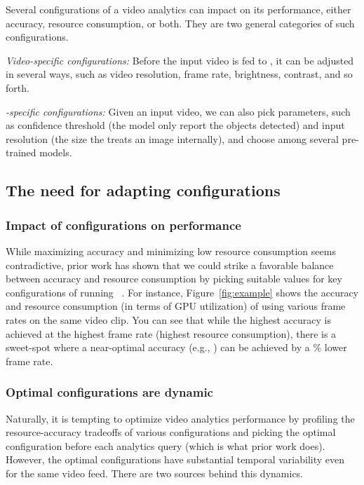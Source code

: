 Several configurations of a video analytics can impact on its 
performance, either accuracy, resource consumption, or both.
They are two general categories of such configurations.
\begin{packeditemize}
\item {\em Video-specific configurations:}
Before the input video is fed to \nn, it can be adjusted in several 
ways, such as video resolution, frame rate, brightness, contrast, and
so forth.
\item {\em \nn-specific configurations:}
Given an input video, we can also pick \nn parameters, such
as confidence threshold (the \nn model only report the objects 
detected) and input resolution (the size the \nn treats an image 
internally), and choose among several pre-trained \nn models.
\end{packeditemize}


\subsection{The need for adapting configurations}

\subsubsection{Impact of configurations on \nn performance}
While maximizing accuracy and minimizing low resource consumption 
seems contradictive, prior work has shown that we could strike a 
favorable balance between accuracy and resource consumption by 
picking suitable values for key configurations of running 
\nn~\cite{videostorm,noscope}.
For instance, Figure~\ref{fig:example} shows the accuracy and 
resource consumption (in terms of GPU utilization) of using various 
frame rates on the same video clip. 
 You can see that while the highest accuracy is achieved at the 
highest frame rate (highest resource consumption), there is a 
sweet-spot where a near-optimal accuracy (e.g., \fillme) can be 
achieved by a \fillme\% lower frame rate.


\subsubsection{Optimal configurations are dynamic}

Naturally, it is tempting to optimize video analytics performance by
profiling the resource-accuracy tradeoffs of various configurations
and picking the optimal configuration before each analytics query 
(which is what prior work does).
However, the optimal configurations have substantial temporal 
variability even for the same video feed. 
There are two sources behind this dynamics.


